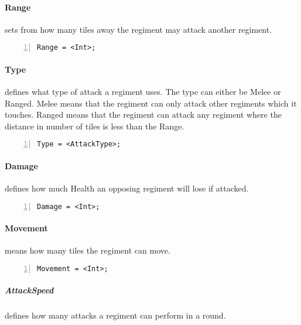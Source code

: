 		\paragraph{Range} sets from how many tiles away the regiment may attack another regiment. 
		
\begin{lstlisting}[basicstyle=\small\sffamily,
keywordstyle={\color{blue}},
comment={[l]{//}}, morecomment={[s]{/*}{*/}}, commentstyle=\itshape,
columns={[l]flexible}, numbers=left, numberstyle=\tiny,
frameround=fftt, frame=shadowbox, captionpos=b,
caption={Range}]
Range = <Int>;
\end{lstlisting}
		\paragraph{Type}
			defines what type of attack a regiment uses. The type can either be Melee or Ranged.
			Melee means that the regiment can only attack other regiments which it touches. Ranged means 
			that the regiment can attack any regiment where the distance in number of tiles is less than the Range.

		\begin{lstlisting}[basicstyle=\small\sffamily,
		keywordstyle={\color{blue}},
		comment={[l]{//}}, morecomment={[s]{/*}{*/}}, commentstyle=\itshape,
		columns={[l]flexible}, numbers=left, numberstyle=\tiny,
		frameround=fftt, frame=shadowbox, captionpos=b,
		caption={Type of regiment}]
Type = <AttackType>; 
			\end{lstlisting}	
		\paragraph{Damage} defines how much Health an opposing regiment will lose if attacked.

		\begin{lstlisting}[basicstyle=\small\sffamily,
		keywordstyle={\color{blue}},
		comment={[l]{//}}, morecomment={[s]{/*}{*/}}, commentstyle=\itshape,
		columns={[l]flexible}, numbers=left, numberstyle=\tiny,
		frameround=fftt, frame=shadowbox, captionpos=b,
		caption={Damage of the regiment}]
Damage = <Int>;
			\end{lstlisting}
		\paragraph{Movement} means how many tiles the regiment can move.

		\begin{lstlisting}[basicstyle=\small\sffamily,
		keywordstyle={\color{blue}},
		comment={[l]{//}}, morecomment={[s]{/*}{*/}}, commentstyle=\itshape,
		columns={[l]flexible}, numbers=left, numberstyle=\tiny,
		frameround=fftt, frame=shadowbox, captionpos=b,
		caption={Movement of the regiment}]
Movement = <Int>;
			\end{lstlisting}
		\subparagraph{AttackSpeed} defines how many attacks a regiment can perform in a round.

